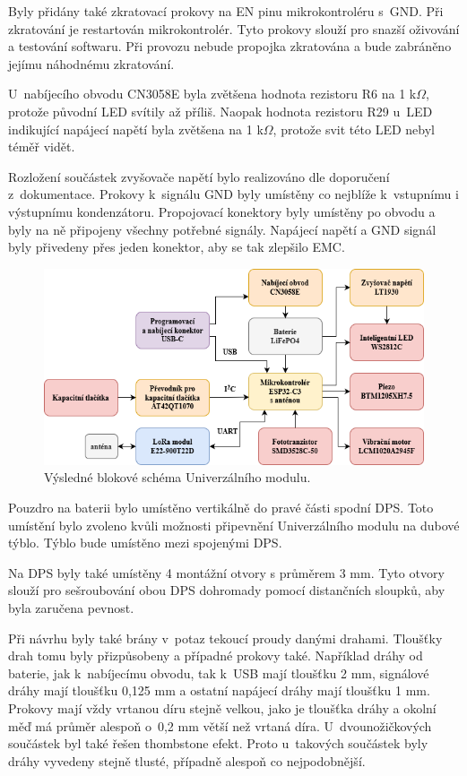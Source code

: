 Byly přidány také zkratovací prokovy na EN pinu mikrokontroléru s~GND. Při zkratování je restartován mikrokontrolér. Tyto prokovy slouží pro snazší oživování a testování softwaru. Při provozu nebude propojka 
zkratována a bude zabráněno jejímu náhodnému zkratování. 

U~nabíjecího obvodu CN3058E byla zvětšena hodnota rezistoru R6 na 1 k$\Omega$, protože původní LED svítily až příliš. Naopak hodnota rezistoru R29 u~LED indikující napájecí napětí byla zvětšena na 1 k$\Omega$, 
protože svit této LED nebyl téměř vidět. 

Rozložení součástek zvyšovače napětí bylo realizováno dle doporučení z~dokumentace. Prokovy k~signálu GND byly umístěny co nejblíže k~vstupnímu i výstupnímu kondenzátoru. Propojovací konektory byly 
umístěny po obvodu a byly na ně připojeny všechny potřebné signály. Napájecí napětí a GND signál byly přivedeny přes jeden konektor, aby se tak zlepšilo EMC. 

\begin{figure}[!h]
  \begin{center}
    \includegraphics[scale=0.65]{obrazky/blokove_schema_finalni_verze.png}
  \end{center}
  \caption[Výsledné blokové schéma Univerzálního modulu]{Výsledné blokové schéma Univerzálního modulu.}
\end{figure}

Pouzdro na baterii bylo umístěno vertikálně do pravé části spodní DPS. Toto umístění bylo zvoleno kvůli možnosti připevnění Univerzálního modulu na dubové týblo. Týblo bude umístěno mezi spojenými DPS. 

Na DPS byly také umístěny 4 montážní otvory s průměrem 3 mm. Tyto otvory slouží pro sešroubování obou DPS dohromady pomocí distančních sloupků, aby byla zaručena pevnost. 

Při návrhu byly také brány v~potaz tekoucí proudy danými drahami. Tloušťky drah tomu byly přizpůsobeny a případné prokovy také. Například dráhy od baterie, jak k~nabíjecímu obvodu, tak k~USB mají tloušťku
2 mm, signálové dráhy mají tloušťku 0,125 mm a ostatní napájecí dráhy mají tloušťku 1 mm. Prokovy mají vždy vrtanou díru stejně velkou, jako je tloušťka dráhy a okolní měď má průměr alespoň o~0,2 mm větší 
než vrtaná díra. U~dvounožičkových součástek byl také řešen thombstone efekt. Proto u~takových součástek byly dráhy vyvedeny stejně tlusté, případně alespoň co nejpodobnější. 
 
